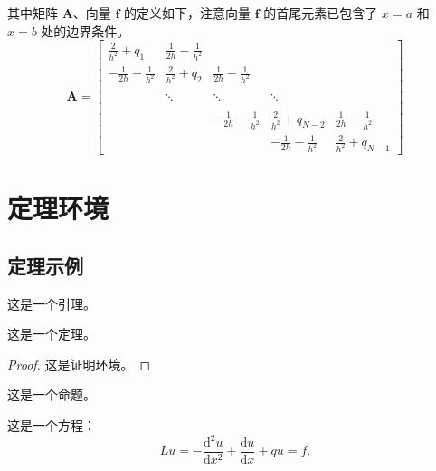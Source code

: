 \documentclass{shnuthesis}
\begin{document}
其中矩阵 $\boldsymbol{A}$、向量 $\boldsymbol{f}$ 的定义如下，注意向量 $\boldsymbol{f}$ 的首尾元素已包含了 $x=a$ 和 $x=b$ 处的边界条件。
\begin{equation}\label{equ:matrix}
\boldsymbol{A}=\left[\begin{array}{cccccc}
\displaystyle \frac{2}{h^{2}}+q_{1} & \displaystyle\frac{1}{2h}-\frac{1}{h^{2}} &   &  &  \\[8pt]
 \displaystyle-\frac{1}{2h}-\frac{1}{h^{2}} & \displaystyle \frac{2}{h^{2}}+q_{2} & \displaystyle\frac{1}{2h}-\frac{1}{h^{2}}  & &  \\[8pt]
  &  &  &  &    \\
   &  \ddots  & \ddots  &   \ddots  &    \\[8pt]
   &  &  &  &    \\
  &   & \displaystyle-\frac{1}{2h}-\frac{1}{h^{2}} & \displaystyle\frac{2}{h^{2}}+q_{N-2}& \displaystyle\frac{1}{2h}-\frac{1}{h^{2}} \\[8pt]
  &  &  & \displaystyle-\frac{1}{2h}-\frac{1}{h^{2}} & \displaystyle \frac{2}{h^{2}}+q_{N-1}
\end{array}\right]
\end{equation}



\chapter{定理环境}

\section{定理示例}

\begin{lemma}[Lemma]
这是一个引理。
\end{lemma}


\begin{theorem}[Theorem]
这是一个定理。
\end{theorem}
\begin{proof}
这是证明环境。
\end{proof}

\begin{proposition}[Proposition]
这是一个命题。
\end{proposition}

这是一个方程：
\begin{equation}\label{Equ21}
L u=-\frac{\mathrm{d}^{2} u}{\mathrm{d} x^{2}}+\frac{\mathrm{d} u}{\mathrm{d} x}+q u=f.
\end{equation}
\end{document}
